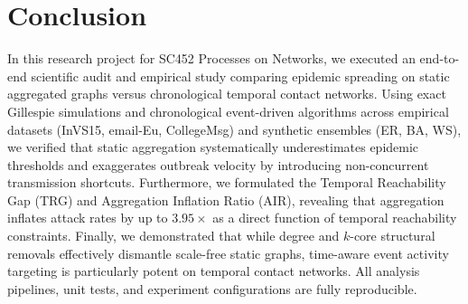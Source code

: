 \documentclass[conference]{IEEEtran}
\begin{document}
\section{Conclusion}
In this research project for SC452 Processes on Networks, we executed an end-to-end scientific audit and empirical study comparing epidemic spreading on static aggregated graphs versus chronological temporal contact networks. Using exact Gillespie simulations and chronological event-driven algorithms across empirical datasets (InVS15, email-Eu, CollegeMsg) and synthetic ensembles (ER, BA, WS), we verified that static aggregation systematically underestimates epidemic thresholds and exaggerates outbreak velocity by introducing non-concurrent transmission shortcuts. Furthermore, we formulated the Temporal Reachability Gap (TRG) and Aggregation Inflation Ratio (AIR), revealing that aggregation inflates attack rates by up to $3.95\times$ as a direct function of temporal reachability constraints. Finally, we demonstrated that while degree and $k$-core structural removals effectively dismantle scale-free static graphs, time-aware event activity targeting is particularly potent on temporal contact networks. All analysis pipelines, unit tests, and experiment configurations are fully reproducible.



\end{document}
